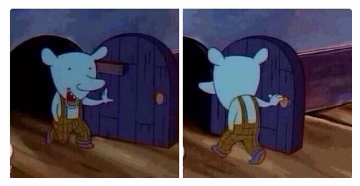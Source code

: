 \begin{center}
\begin{figure}[h]
\begin{subfigure}
		\end{subfigure} 
		\begin{subfigure}
		\left	
		\includegraphics[scale=0.3]{images/meme3.jpg}
	\end{subfigure} 		
	\end{figure}
\end{center}